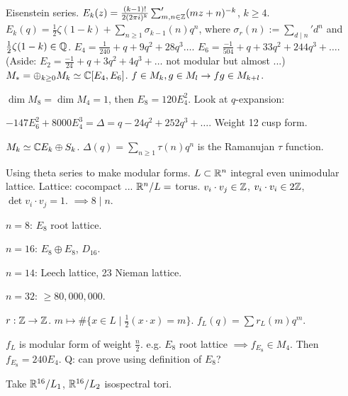 \documentclass[]{article}
\begin{document}
\begin{example}
	Eisenstein series. $E_k(z) = \frac{(k-1)!}{2(2\pi i)^k} \sum_{m,n\in\mathbb{Z}}' (mz+n)^{-k}$, $k\geq 4$.
	$E_k(q) = \frac{1}{2} \zeta(1-k) + \sum_{n\geq 1} \sigma_{k-1}(n)q^n$, where $\sigma_r(n) := \sum_{d\mid n}' d^n$ and $\frac{1}{2} \zeta(1-k) \in\mathbb{Q}$.
	$E_4 = \frac{1}{240} + q + 9q^2 + 28q^3 \dots$.
	$E_6 = \frac{-1}{504} + q + 33q^2 + 244 q^3 + \dots$.
	(Aside: $E_2 = \frac{-1}{24} + q + 3q^2 + 4q^3 + \dots$ not modular but almost ...)
	$M_* = \oplus_{k\geq 0} M_k \simeq \mathbb{C}[E_4,E_6]$. $f\in M_k, g\in M_l \rightarrow fg\in M_{k+l}$.
\end{example}

\begin{example}
	$\dim M_8 = \dim M_4 = 1$, then $E_8 = 120 E_4^2$. Look at $q$-expansion:%
\end{example}

\begin{example}
	$-147 E_6^2 + 8000 E_4^3 = \Delta = q - 24q^2 + 252q^3 + \dots$. Weight 12 cusp form.
	\begin{fact}
		$M_k \simeq \mathbb{C} E_k \oplus S_k$. $\Delta(q) = \sum_{n\geq 1} \tau(n) q^n$ is the Ramanujan $\tau$ function.
	\end{fact}
\end{example}
\begin{example}
	Using theta series to make modular forms. $L\subset \mathbb{R}^n$ integral even unimodular lattice. Lattice: cocompact ... $\mathbb{R}^n/L = $ torus. $v_i\cdot v_j \in \mathbb{Z}$, $v_i\cdot v_i\in 2\mathbb{Z}$, $\det{v_i\cdot v_j} = 1$. $\implies 8\mid n$.
\end{example}

$n = 8$: $E_8$ root lattice.

$n = 16$: $E_8\oplus E_8$, $D_{16}$.

$n = 14$: Leech lattice, 23 Nieman lattice.

$n = 32$: $\geq 80,000,000$.

\begin{definition}
	$r:\mathbb{Z} \rightarrow \mathbb{Z}$. $m\mapsto \#\{x\in L \mid \frac{1}{2}(x\cdot x) = m \}$. $f_L(q) = \sum r_L(m) q^m$.
	\begin{fact}
		$f_L$ is modular form of weight $\frac{n}{2}$. e.g. $E_8$ root lattice $\implies f_{E_8} \in M_4$. Then $f_{E_8} = 240 E_4$. Q: can prove using definition of $E_8$?
	\end{fact}
	Take $\mathbb{R}^{16}/L_1$, $\mathbb{R}^{16}/L_2$ isospectral tori.
\end{definition}
\end{document}
